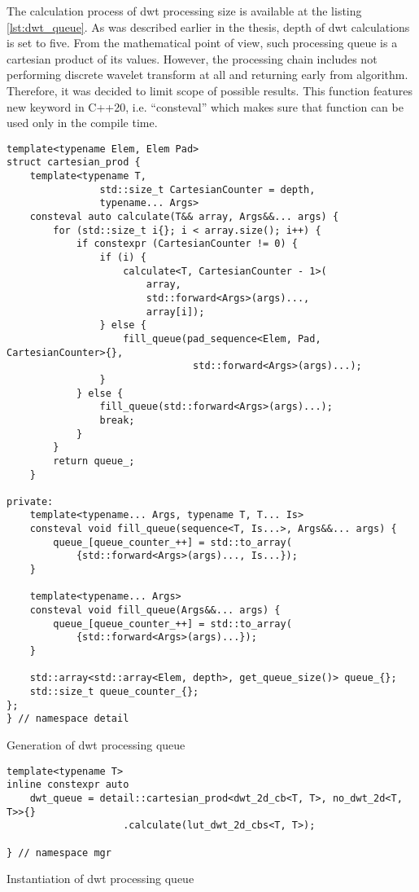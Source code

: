 The calculation process of dwt processing size is available at the listing \ref{lst:dwt_queue}.
As was described earlier in the thesis, depth of dwt calculations is set to five. From the
mathematical point of view, such processing queue is a cartesian product of its values.
However, the processing chain includes not performing discrete wavelet transform at all
and returning early from algorithm. Therefore, it was decided to limit scope of possible
results. This function features new keyword in C++20, i.e. ``consteval'' which makes sure
that function can be used only in the compile time.

\begin{listing}[htb]
\begin{verbatim}
template<typename Elem, Elem Pad>
struct cartesian_prod {
    template<typename T,
                std::size_t CartesianCounter = depth,
                typename... Args>
    consteval auto calculate(T&& array, Args&&... args) {
        for (std::size_t i{}; i < array.size(); i++) {
            if constexpr (CartesianCounter != 0) {
                if (i) {
                    calculate<T, CartesianCounter - 1>(
                        array,
                        std::forward<Args>(args)...,
                        array[i]);
                } else {
                    fill_queue(pad_sequence<Elem, Pad, CartesianCounter>{},
                                std::forward<Args>(args)...);
                }
            } else {
                fill_queue(std::forward<Args>(args)...);
                break;
            }
        }
        return queue_;
    }

private:
    template<typename... Args, typename T, T... Is>
    consteval void fill_queue(sequence<T, Is...>, Args&&... args) {
        queue_[queue_counter_++] = std::to_array(
            {std::forward<Args>(args)..., Is...});
    }

    template<typename... Args>
    consteval void fill_queue(Args&&... args) {
        queue_[queue_counter_++] = std::to_array(
            {std::forward<Args>(args)...});
    }

    std::array<std::array<Elem, depth>, get_queue_size()> queue_{};
    std::size_t queue_counter_{};
};
} // namespace detail
\end{verbatim}
\caption{Generation of dwt processing queue}
\label{lst:dwt_queue}
\end{listing}

\begin{listing}[htb]
\begin{verbatim}
template<typename T>
inline constexpr auto
    dwt_queue = detail::cartesian_prod<dwt_2d_cb<T, T>, no_dwt_2d<T, T>>{}
                    .calculate(lut_dwt_2d_cbs<T, T>);

} // namespace mgr
\end{verbatim}
\caption{Instantiation of dwt processing queue}
\label{lst:dwt_queue_instantiation}
\end{listing}

